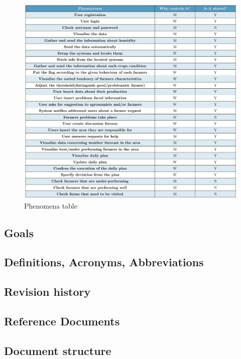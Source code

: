\begin{figure}[H]
	\centering
    \includegraphics[page=1, width=\textwidth]{Tikz_stuff/Phenomena _table_external_project.pdf}
	\caption{\label{tab:phenomena}Phenomena table}
\end{figure}



\subsection{Goals}

\subsection{Definitions, Acronyms, Abbreviations}
\subsection{Revision history}
		
\subsection{Reference Documents}
\subsection{Document structure}

